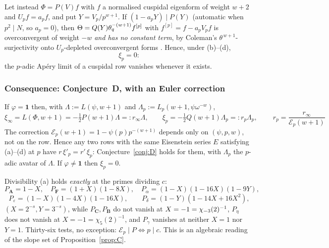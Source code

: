 \begin{proposition}\label{prop:cusp}
\Proved{} Let instead $\Phi=P(V)f$ with $f$ a normalised cuspidal eigenform of
weight $w+2$ and $U_pf=a_pf$, and put $Y=V_p/p^{w+1}$.  If $(1-a_pY)\mid P(Y)$
\textup{(}automatic when $p^2\mid N$, so $a_p=0$\textup{)}, then
$\Theta=Q(Y)\theta_q^{-(w+1)}f^{[p]}$ with $f^{[p]}=f-a_pV_pf$ is overconvergent
of weight $-w$ \emph{and has no constant term}, by Coleman's
$\theta^{\,w+1}$-surjectivity onto $U_p$-depleted overconvergent forms
\cite{Coleman1996}.  Hence, under \textup{(b)}--\textup{(d)},
\[
\xi_p=0 :
\]
the $p$-adic Ap\'ery limit of a cuspidal row vanishes whenever it exists.
\end{proposition}

\subsubsection*{Consequence: Conjecture~D, with an Euler correction}

\begin{corollary}\label{cor:rp}
\Proved{} If $\varphi=\mathbf 1$ then, with $\Lambda:=L(\psi,w+1)$ and
$\Lambda_p:=L_p(w+1,\psi\omega^{-w})$,
\[
\xi_\infty=L(\Phi,w+1)=-\tfrac12P(w+1)\Lambda=:r_\infty\Lambda,\qquad
\xi_p=-\tfrac12Q(w+1)\Lambda_p=:r_p\Lambda_p,\qquad
\boxed{\ r_p=\frac{r_\infty}{\mathcal E_p(w+1)}\ }
\]
The correction $\mathcal E_p(w+1)=1-\psi(p)p^{-(w+1)}$ depends only on
$(\psi,p,w)$, not on the row.  Hence any two rows with the same Eisenstein
series $E$ satisfying \textup{(a)}--\textup{(d)} at $p$ have
$r\,\xi'_p=r'\,\xi_p$: Conjecture~\ref{conj:D} holds for them, with
$\Lambda_p$ the $p$-adic avatar of $\Lambda$.  If $\varphi\neq\mathbf 1$ then
$\xi_p=0$.
\end{corollary}

\begin{remark}
Divisibility (a) holds \emph{exactly} at the primes dividing $c$:
\[
P_{\mathbf A}=1-X,\quad P_{\mathbf F}=(1+X)(1-8X),\quad
P_\alpha=(1-X)(1-16X)(1-9Y),
\]
\[
P_\varepsilon=(1-X)(1-4X)(1-16X),\qquad P_\delta=(1-Y)(1-14X+16X^2),
\]
$(X=2^{-s},Y=3^{-s})$, while $P_{\mathbf C},P_{\mathbf B}$ do not vanish at
$X=-1=\chi_{-3}(2)^{-1}$, $P_\eta$ does not vanish at $X=-1=\chi_5(2)^{-1}$, and
$P_\gamma$ vanishes at neither $X=1$ nor $Y=1$.  Thirty-six tests, no
exception: \emph{$\mathcal E_p\mid P\iff p\mid c$}.  This is an algebraic
reading of the slope set of Proposition~\ref{prop:C}.
\end{remark}

